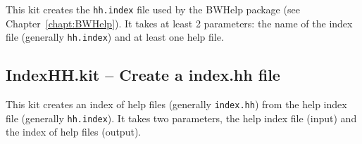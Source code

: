 This kit creates the \lstinline=hh.index= file used by the BWHelp
package (see Chapter~\ref{chapt:BWHelp}).  It takes at least 2
parameters: the name of the index file (generally \lstinline=hh.index=)
and at least one help file.

\subsection{IndexHH.kit -- Create a index.hh file}
\label{sect:STR:indexhh}

This kit creates an index of help files (generally
\lstinline=index.hh=) from the help index file (generally
\lstinline=hh.index=).  It takes two parameters, the  help index file
(input) and the index of help files (output).

